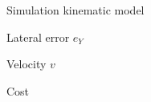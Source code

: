 \begin{figure}[ht]
	\centering
  	
	\caption{Simulation kinematic model}
	\label{fig:SimKin_xy}
\end{figure}

\begin{figure}[ht]
	\centering
  	
  	\caption{Lateral error $e_Y$}
	\label{fig:SimKin_eY}
\end{figure}

\begin{figure}[ht]
	\centering
  	
  	\caption{Velocity $v$}
	\label{fig:SimKin_v}
\end{figure}

\begin{figure}[ht]
	\centering
  	
  	\caption{Cost}
	\label{fig:SimKin_cost}
\end{figure}
